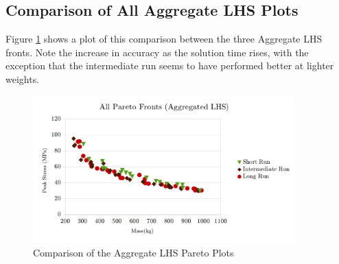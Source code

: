 \subsection{Comparison of All Aggregate LHS Plots}
Figure \ref{fig:pfront_comp_agg} shows a plot of this comparison between the three Aggregate LHS fronts. Note the increase in accuracy as the solution time rises, with the exception that the intermediate run seems to have performed better at lighter weights. 

\begin{figure}[!htbp]
\includegraphics[width=0.9\textwidth]{img/pf_comp_agg.png}
\caption{Comparison of the Aggregate LHS Pareto Plots}
\label{fig:pfront_comp_agg}
\end{figure}
